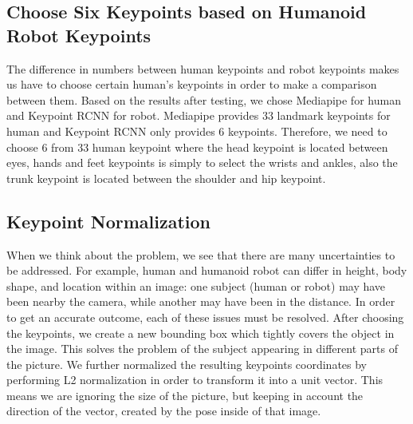\subsection{Choose Six Keypoints based on Humanoid Robot Keypoints}
\label{subsec:choose-keypoints}

The difference in numbers between human keypoints and robot keypoints makes us have to choose certain human's keypoints in order to make a comparison between them.
Based on the results after testing, we chose Mediapipe for human and Keypoint RCNN for robot. Mediapipe provides 33 landmark keypoints for human and Keypoint RCNN only provides 6 keypoints.
Therefore, we need to choose 6 from 33 human keypoint where the head keypoint is located between eyes, hands and feet keypoints is simply to select the wrists and ankles, also the trunk keypoint is located between the shoulder and hip keypoint.


\subsection{Keypoint Normalization}
\label{subsec:keypoint-normalization}

When we think about the problem, we see that there are many uncertainties to be addressed. For example, human and humanoid robot can differ in height, body shape, and location within an image: one subject (human or robot) may have been nearby the camera,
while another may have been in the distance. In order to get an accurate outcome, each of these issues must be resolved.
After choosing the keypoints, we create a new bounding box which tightly covers the object in the image.
This solves the problem of the subject appearing in different parts of the picture.
We further normalized the resulting keypoints coordinates by performing L2 normalization in order to transform it into a unit vector.
This means we are ignoring the size of the picture, but keeping in account the direction of the vector, created by the pose inside of that image.


